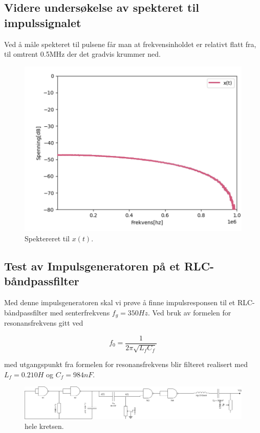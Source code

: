 \subsection{Videre undersøkelse av spekteret til impulssignalet}
\label{videre_undersøkelse_spekter}

Ved å måle spekteret til pulsene får man at frekvensinholdet er relativt flatt fra, til omtrent 0.5MHz der det gradvis krummer ned.

\begin{figure}[!hbt]
	\centering
	\includegraphics[scale=0.5]{./Images/02Concept/09spekter.png}
	\caption{Spektereret til $x(t)$.}
    \label{fig:spekter}
\end{figure}


\subsection{Test av Impulsgeneratoren på et RLC-båndpassfilter}
\label{test_impuls}

Med denne impulsgeneratoren skal vi prøve å finne impulsresponsen til et RLC-båndpassfilter med senterfrekvens $f_g = 350Hz$. Ved bruk av formelen for resonansfrekvens gitt ved

\begin{equation}
	f_0 = \frac{1}{2 \pi \sqrt{L_f C_f}}
\end{equation}

med utgangspunkt fra formelen for resonansfrekvens blir filteret realisert med $L_f = 0.210 H$ og $C_f=984nF$. 

\begin{figure}[!hbt]
	\centering
	\includegraphics[scale=0.3]{./Images/02Concept/10alt.png}
	\caption{hele kretsen.}
    \label{fig:hele}
\end{figure}

